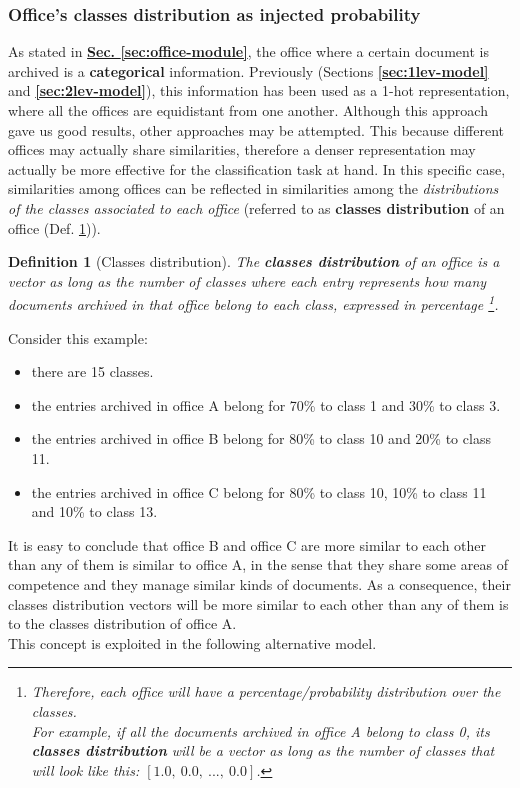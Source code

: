 \documentclass[12pt]{article}
\begin{document}
\subsubsection{Office's classes distribution as injected probability}\label{sec:cls-distr-bias}
As stated in \hyperref[sec:office-module]{\textbf{Sec. \ref{sec:office-module}}}, the office where a certain document is archived is a \textbf{categorical} information.
Previously (Sections \textbf{\ref{sec:1lev-model}} and \textbf{\ref{sec:2lev-model}}), this information has been used as a 1-hot representation, where all the offices are equidistant from one another. Although this approach gave us good results, other approaches may be attempted.
This because different offices may actually share similarities, therefore a denser representation may actually be more effective for the classification task at hand.
In this specific case, similarities among offices can be reflected in similarities among the \textit{distributions of the classes associated to each office} (referred to as \textbf{classes distribution} of an office (Def. \ref{def:cls_distr})).
\newtheorem{definition}{Definition}
\begin{definition}[Classes distribution]\label{def:cls_distr}
    The \textbf{classes distribution} of an office is a vector as long as the number of classes where each entry represents how many documents archived in that office belong to each class, expressed in percentage
    \footnote{Therefore, each office will have a percentage/probability distribution over the classes.\\For example, if all the documents archived in \textit{office A} belong to class 0, its \textbf{classes distribution} will be a vector as long as the number of classes that will look like this: $[1.0,\ 0.0,\ ...,\ 0.0]$.}.
\end{definition}
Consider this example:
\begin{itemize}
    \item there are 15 classes.
    \item the entries archived in office A belong for 70\% to class 1 and 30\% to class 3.
    \item the entries archived in office B belong for 80\% to class 10 and 20\% to class 11.
    \item the entries archived in office C belong for 80\% to class 10, 10\% to class 11 and 10\% to class 13.
\end{itemize}
It is easy to conclude that office B and office C are more similar to each other than any of them is similar to office A, in the sense that they share some areas of competence and they manage similar kinds of documents.
As a consequence, their classes distribution vectors will be more similar to each other than any of them is to the classes distribution of office A.\\
This concept is exploited in the following alternative model.
\end{document}
